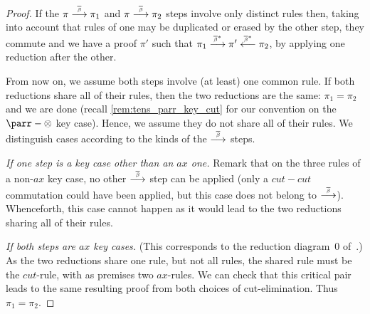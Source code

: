 \documentclass{lmcs}
\newcommand*{\tens}{\otimes} %
\newcommand{\symboltext}[2]{\mathrel{\overset{\makebox[0pt]{\mbox{\normalfont\tiny\sffamily \ensuremath{#1}}}}{#2}}} %
\newcommand{\betabar}{\overline{\beta}}
\newcommand{\betabarto}{\symboltext{\betabar}{\longrightarrow}}
\newcommand{\betabarfrom}{\symboltext{\betabar}{\longleftarrow}}
\newcommand{\betabartostar}{\symboltext{\betabar^*}{\longrightarrow}}
\newcommand{\betabarfromstar}{\symboltext{\betabar^*}{\longleftarrow}}
\newcommand*{\proofpar}[1]{\textit{#1}}
\begin{document}
\begin{proof}
If the $\pi\betabarto\pi_1$ and $\pi\betabarto\pi_2$ steps involve only distinct rules then, taking into account that rules of one may be duplicated or erased by the other step, they commute and we have a proof $\pi'$ such that $\pi_1\betabartostar\pi'\betabarfromstar\pi_2$, by applying one reduction after the other.

From now on, we assume both steps involve (at least) one common rule.
If both reductions share all of their rules, then the two reductions are the same: $\pi_1=\pi_2$ and we are done (recall \autoref{rem:tens_parr_key_cut} for our convention on the $\parr-\tens$ key case).
Hence, we assume they do not share all of their rules.
We distinguish cases according to the kinds of the $\betabarto$ steps.

\proofpar{If one step is a key case other than an $ax$ one.}
Remark that on the three rules of a non-$ax$ key case, no other $\betabarto$ step can be applied (only a $cut-cut$ commutation could have been applied, but this case does not belong to $\betabarto$).
Whenceforth, this case cannot happen as it would lead to the two reductions sharing all of their rules.

\proofpar{If both steps are $ax$ key cases.}
(This corresponds to the reduction diagram~0 of~\cite[Section~B.2.1]{calculusformall}.)
As the two reductions share one rule, but not all rules, the shared rule must be the $cut$-rule, with as premises two $ax$-rules.
We can check that this critical pair leads to the same resulting proof from both choices of cut-elimination.
Thus $\pi_1=\pi_2$.


\end{proof}
\end{document}
